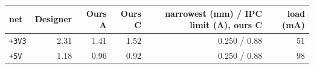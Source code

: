 \begin{tabular}{lrrrrr}
\toprule
net & Designer & Ours A & Ours C & narrowest (mm) / IPC limit (A), ours C & load (mA) \\
\midrule
\texttt{+3V3} & 2.31 & 1.41 & 1.52 & 0.250 / 0.88 & 51 \\
\texttt{+5V} & 1.18 & 0.96 & 0.92 & 0.250 / 0.88 & 98 \\
\bottomrule
\end{tabular}
